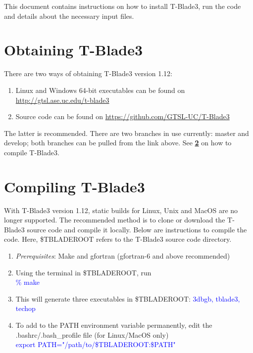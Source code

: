 \documentclass[8pt]{article}
\begin{document}
\noindent
This document contains instructions on how to install T-Blade3, run the code and details about the necessary input files.

\section{Obtaining T-Blade3}
\noindent 
There are two ways of obtaining T-Blade3 version 1.12:
 
\begin{enumerate}[leftmargin=*]
    \item Linux and Windows 64-bit executables can be found on \url{http://gtsl.ase.uc.edu/t-blade3}
    \item Source code can be found on \url{https://github.com/GTSL-UC/T-Blade3}
\end{enumerate}

\noindent
The latter is recommended. There are two branches in use currently: {\selectfont master} and {\selectfont develop}; both branches can be pulled from the link above. See \textbf{\ref{compilesec}} on how to compile T-Blade3.

\section{Compiling T-Blade3}\label{compilesec}
\noindent
With T-Blade3 version 1.12, static builds for Linux, Unix and MacOS are no longer supported. The recommended method is to clone or download the T-Blade3 source code and compile it locally. Below are instructions to compile the code. Here, \$TBLADEROOT refers to the T-Blade3 source code directory. 

\begin{enumerate}[leftmargin=*]
    \item \textit{Prerequisites}: Make and gfortran (gfortran-6 and above recommended)
    \item Using the terminal in \$TBLADEROOT, run\\
          \textcolor{blue}{\selectfont \% make}
    \item This will generate three executables in \$TBLADEROOT: \textcolor{blue}{\selectfont 3dbgb, tblade3, techop}
    \item To add to the PATH environment variable permanently, edit the .bashrc/.bash\_profile file (for Linux/MacOS only)\\
          \textcolor{blue}{\selectfont export PATH="/path/to/\$TBLADEROOT:\$PATH"}
\end{enumerate}
\end{document}
